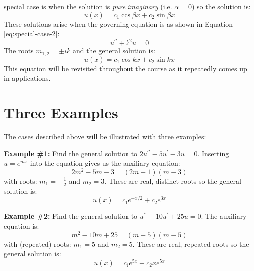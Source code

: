 \begin{enumerate}
 special case is when the solution is \emph{pure imaginary} (i.e. $\alpha = 0$) so the solution is:
\begin{equation}
u(x) = c_1 \cos{\beta x} + c_2 \sin{\beta x}
\end{equation}
These solutions arise when the governing equation is as shown in Equation \ref{eq:special-case-2}:
\begin{equation}
u^{\prime \prime} + k^2 u = 0
\label{eq:special-case-2}
\end{equation}
The roots $m_{1,2} = \pm ik$ and the general solution is:
\begin{equation}
u(x)=c_1 \cos{kx} + c_2 \sin{kx}
\end{equation}
This equation will be revisited throughout the course as it repeatedly comes up in applications.
\end{enumerate}

\section{Three Examples}
The cases described above will be illustrated with three examples:

\vspace{0.5cm}
\noindent\textbf{Example \#1:}
Find the general solution to $2u^{\prime \prime}-5u^{\prime}-3u = 0$. Inserting $u = e^{mx}$ into the equation gives us the auxiliary equation:
\begin{equation*}
2m^2 - 5m - 3 = (2m+1)(m-3)
\end{equation*}
with roots: $m_1 = -\frac{1}{2}$ and $m_2 = 3$.  These are real, distinct roots so the general solution is:
\begin{equation*}
u(x) = c_1e^{-x/2}+c_2e^{3x}
\end{equation*}

\vspace{0.5cm}

\noindent\textbf{Example \#2:}
Find the general solution to $u^{\prime \prime}-10u^{\prime}+25u = 0$.
The auxiliary equation is:
\begin{equation*}
m^2-10m+25 = (m-5)(m-5)
\end{equation*}
with (repeated) roots: $m_1 = 5$ and $m_2 = 5$.  These are real, repeated roots so the general solution is:
\begin{equation*}
u(x) = c_1e^{5x} + c_2xe^{5x}
\end{equation*}

\vspace{0.5cm}

